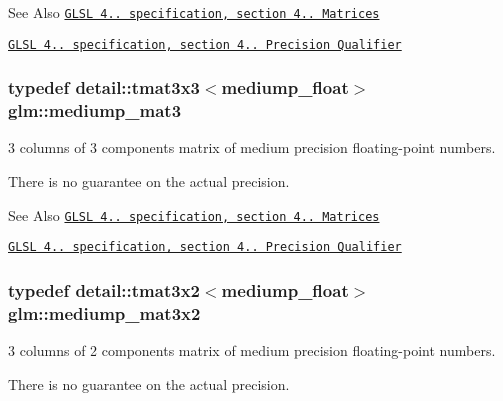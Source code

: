 \begin{DoxySeeAlso}{See Also}
\href{http://www.opengl.org/registry/doc/GLSLangSpec.4.20.8.pdf}{\tt G\-L\-S\-L 4.. specification, section 4.. Matrices} 

\href{http://www.opengl.org/registry/doc/GLSLangSpec.4.20.8.pdf}{\tt G\-L\-S\-L 4.. specification, section 4.. Precision Qualifier} 
\end{DoxySeeAlso}
\hypertarget{group__core__precision_gab9f55249d1c065a72d525f3ffd3524be}{
\subsubsection[{mediump\-\_\-mat3}]{\setlength{\rightskip}{0pt plus 5cm}typedef detail\-::tmat3x3$<$mediump\-\_\-float$>$ {\bf glm\-::mediump\-\_\-mat3}}}\label{group__core__precision_gab9f55249d1c065a72d525f3ffd3524be}


3 columns of 3 components matrix of medium precision floating-\/point numbers. 

There is no guarantee on the actual precision.

\begin{DoxySeeAlso}{See Also}
\href{http://www.opengl.org/registry/doc/GLSLangSpec.4.20.8.pdf}{\tt G\-L\-S\-L 4.. specification, section 4.. Matrices} 

\href{http://www.opengl.org/registry/doc/GLSLangSpec.4.20.8.pdf}{\tt G\-L\-S\-L 4.. specification, section 4.. Precision Qualifier} 
\end{DoxySeeAlso}
\hypertarget{group__core__precision_ga74c660239e7f6b76796f1b4990083ec6}{
\subsubsection[{mediump\-\_\-mat3x2}]{\setlength{\rightskip}{0pt plus 5cm}typedef detail\-::tmat3x2$<$mediump\-\_\-float$>$ {\bf glm\-::mediump\-\_\-mat3x2}}}\label{group__core__precision_ga74c660239e7f6b76796f1b4990083ec6}


3 columns of 2 components matrix of medium precision floating-\/point numbers. 

There is no guarantee on the actual precision.

